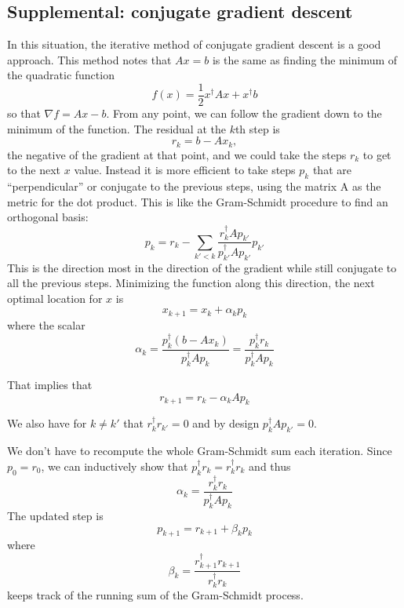 \begin{subappendices}
  \section{Supplemental: conjugate gradient descent}
In this situation, the iterative method of conjugate gradient descent is a good approach.  This method notes that $Ax = b$ is the same as finding the minimum of the quadratic function
\begin{equation}
  f(x) = \frac{1}{2} x^\dag A x +  x^\dag  b
\end{equation}
so that $\nabla f = Ax - b$.  From any point, we can follow the gradient down to the minimum of the function.  The residual at the $k$th step is
\begin{equation}
  r_k = b - A x_k,
\end{equation}
the negative of the gradient at that point, and we could take the steps $r_k$ to get to the next $x$ value.  Instead it is more efficient to take steps $p_k$ that are ``perpendicular'' or conjugate to the previous steps, using the matrix A as the metric for the dot product.  This is like the Gram-Schmidt procedure to find an orthogonal basis:
\begin{equation}
  p_k = r_k - \sum_{k'<k} \frac{r_{k}^\dag A p_{k'}}{ p_{k'}^\dag A p_{k'}} p_{k'}
\end{equation}
This is the direction most in the direction of the gradient while still conjugate to all the previous steps.  Minimizing the function along this direction, the next optimal location for $x$ is
\begin{equation}
  x_{k+1} = x_k + \alpha_k p_k
\end{equation}
where the scalar 
\begin{equation}
  \alpha_k = \frac{p_k^\dag (b - A x_k)}{p_{k}^\dag A p_{k}} = \frac{p_k^\dag r_k}{p_{k}^\dag A p_{k}} 
\end{equation}

That implies that 
\begin{equation}
  r_{k+1} = r_k - \alpha_k A p_k
\end{equation}

We also have for $k\neq k'$ that  $r_k^\dag r_{k'} = 0$ and by design
$  p_k^\dag A p_{k'} = 0$.

We don't have to recompute the whole Gram-Schmidt sum each iteration.  Since $p_0 = r_0$, we can inductively show that $p_k^\dag r_k = r_k^\dag r_k$ and thus
\begin{equation}
  \alpha_k = \frac{r_k^\dag r_k}{p_{k}^\dag A p_{k}}
\end{equation}
The updated step is
\begin{equation}
  p_{k+1} = r_{k+1} + \beta_k p_k
\end{equation}
where
\begin{equation}
  \beta_k = \frac{r_{k+1}^\dag r_{k+1}}{r_k^\dag r_k}
\end{equation}
keeps track of the running sum of the Gram-Schmidt process.


\end{subappendices}
